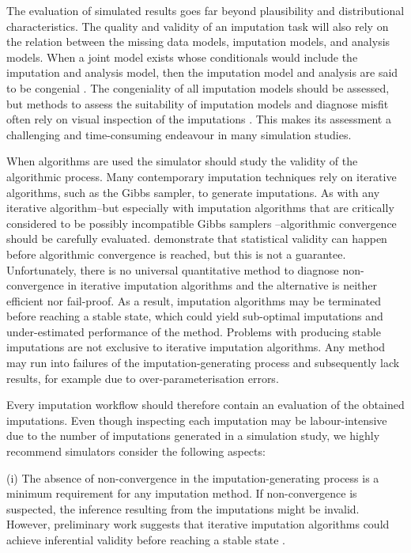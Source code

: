 \documentclass[bimj,fleqn]{w-art}
\begin{document}
The evaluation of simulated results goes far beyond plausibility and distributional characteristics. The quality and validity of an imputation task will also rely on the relation between the missing data models, imputation models, and analysis models. When a joint model exists whose conditionals would include the imputation and analysis model, then the imputation model and analysis are said to be congenial \citep{meng94, bart2015}. The congeniality of all imputation models should be assessed, but methods to assess the suitability of imputation models and diagnose misfit often rely on visual inspection of the imputations \citep[see e.g.][]{abayomi2008diagnostics, bond16}. This makes its assessment a challenging and time-consuming endeavour in many simulation studies. 

When algorithms are used the simulator should study the validity of the algorithmic process. Many contemporary imputation techniques rely on iterative algorithms, such as the Gibbs sampler, to generate imputations. As with any iterative algorithm--but especially with imputation algorithms that are critically considered to be possibly incompatible Gibbs samplers \citep[PIGS,][]{li2012imputing}--algorithmic convergence should be carefully evaluated. \citet{ober21} demonstrate that statistical validity can happen before algorithmic convergence is reached, but this is not a guarantee. Unfortunately, there is no universal quantitative method to diagnose non-convergence in iterative imputation algorithms \citep{zhu15, ober21} and the alternative \citep[visual inspection of the imputation algorithm;][]{buur18} is neither efficient nor fail-proof. As a result, imputation algorithms may be terminated before reaching a stable state, which could yield sub-optimal imputations and under-estimated performance of the method. Problems with producing stable imputations are not exclusive to iterative imputation algorithms. Any method may run into failures of the imputation-generating process and subsequently lack results, for example due to over-parameterisation errors.

Every imputation workflow should therefore contain an evaluation of the obtained imputations. Even though inspecting each imputation may be labour-intensive due to the number of imputations generated in a simulation study, we highly recommend simulators consider the following aspects:

(i) The absence of non-convergence in the imputation-generating process is a minimum requirement for any imputation method. If non-convergence is suspected, the inference resulting from the imputations might be invalid. However, preliminary work suggests that iterative imputation algorithms could achieve inferential validity before reaching a stable state \citep{ober21}. 
\end{document}
